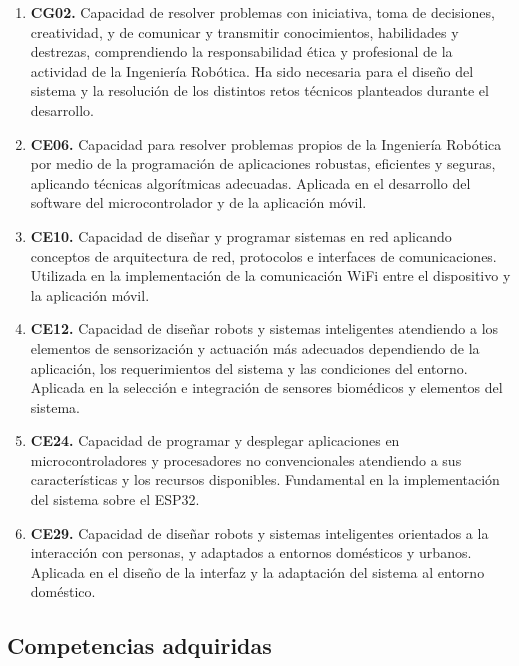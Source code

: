 \begin{enumerate}
    \item \textbf{CG02.} Capacidad de resolver problemas con iniciativa, toma de decisiones, creatividad, y de comunicar y transmitir conocimientos, habilidades y destrezas, comprendiendo la responsabilidad ética y profesional de la actividad de la Ingeniería Robótica. Ha sido necesaria para el diseño del sistema y la resolución de los distintos retos técnicos planteados durante el desarrollo.

    \item \textbf{CE06.} Capacidad para resolver problemas propios de la Ingeniería Robótica por medio de la programación de aplicaciones robustas, eficientes y seguras, aplicando técnicas algorítmicas adecuadas. Aplicada en el desarrollo del software del microcontrolador y de la aplicación móvil.

    \item \textbf{CE10.} Capacidad de diseñar y programar sistemas en red aplicando conceptos de arquitectura de red, protocolos e interfaces de comunicaciones. Utilizada en la implementación de la comunicación WiFi entre el dispositivo y la aplicación móvil.

    \item \textbf{CE12.} Capacidad de diseñar robots y sistemas inteligentes atendiendo a los elementos de sensorización y actuación más adecuados dependiendo de la aplicación, los requerimientos del sistema y las condiciones del entorno. Aplicada en la selección e integración de sensores biomédicos y elementos del sistema.

    \item \textbf{CE24.} Capacidad de programar y desplegar aplicaciones en microcontroladores y procesadores no convencionales atendiendo a sus características y los recursos disponibles. Fundamental en la implementación del sistema sobre el ESP32.

    \item \textbf{CE29.} Capacidad de diseñar robots y sistemas inteligentes orientados a la interacción con personas, y adaptados a entornos domésticos y urbanos. Aplicada en el diseño de la interfaz y la adaptación del sistema al entorno doméstico.
\end{enumerate}

\subsection{Competencias adquiridas}

